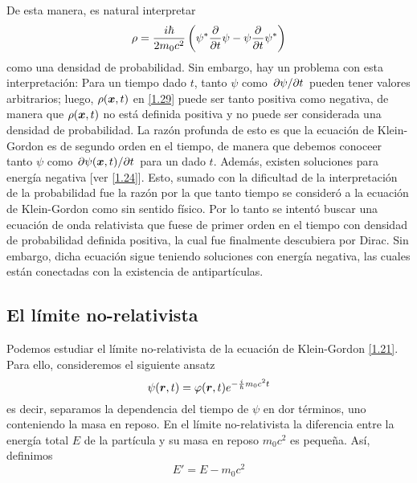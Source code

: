 De esta manera, es natural interpretar
\begin{equation}
  \rho =\frac{i\hbar}{2m_0c^2}\left(\psi^*\pdv{t}\psi-\psi\pdv{t}\psi^*\right)
\end{equation}
como una densidad de probabilidad. Sin embargo, hay un problema con esta interpretación: Para un tiempo dado $t$, tanto $\psi$ como $\pdv*{\psi}{t}$ pueden tener valores arbitrarios; luego, $\rho(\vb*{x},t) $ en \eqref{1.29} puede ser tanto positiva como negativa, de manera que $\rho(\vb*{x},t) $ no está definida positiva y no puede ser considerada una densidad de probabilidad. La razón profunda de esto es que la ecuación de Klein-Gordon es de segundo orden en el tiempo, de manera que debemos conoceer tanto $\psi$ como $\pdv*{\psi(\vb*{x},t) }{t}$ para un dado $t$. Además, existen soluciones para energía negativa [ver \eqref{1.24}]. Esto, sumado con la dificultad de la interpretación de la probabilidad fue la razón por la que tanto tiempo se consideró a la ecuación de Klein-Gordon como sin sentido físico. Por lo tanto se intentó buscar una ecuación de onda relativista que fuese de primer orden en el tiempo con densidad de probabilidad definida positiva, la cual fue finalmente descubiera por Dirac. Sin embargo, dicha ecuación sigue teniendo soluciones con energía negativa, las cuales están conectadas con la existencia de antipartículas.

\subsection{El límite no-relativista}
Podemos estudiar el límite no-relativista de la ecuación de Klein-Gordon \eqref{1.21}. Para ello, consideremos el siguiente ansatz
\begin{equation}
  \psi(\vb*{r},t) =\varphi(\vb*{r},t) e^{-\frac{i}{\hbar}m_0c^2t}
\end{equation}
es decir, separamos la dependencia del tiempo de $\psi$ en dor términos, uno conteniendo la masa en reposo. En el límite no-relativista la diferencia entre la energía total $E$ de la partícula y su masa en reposo $m_0c^2$ es pequeña. Así, definimos
\begin{equation}
  E'=E-m_0c^2
\end{equation}

















































